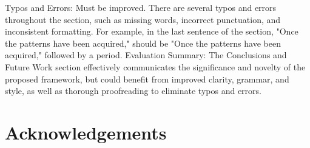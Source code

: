 \documentclass{article}%
\begin{document}
\newline%
Typos and Errors:\newline%
Must be improved. There are several typos and errors throughout the section, such as missing words, incorrect punctuation, and inconsistent formatting. For example, in the last sentence of the section, "Once the patterns have been acquired," should be "Once the patterns have been acquired," followed by a period.\newline%
\newline%
Evaluation Summary:\newline%
The Conclusions and Future Work section effectively communicates the significance and novelty of the proposed framework, but could benefit from improved clarity, grammar, and style, as well as thorough proofreading to eliminate typos and errors.

%
\newpage%
\section*{Acknowledgements}


\vspace{6pt} 










\end{document}
